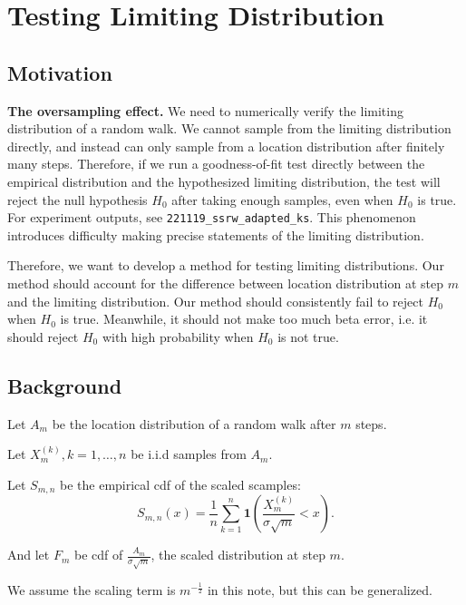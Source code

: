 
\section{Testing Limiting Distribution}

\subsection*{Motivation}

\textbf{The oversampling effect.} We need to numerically verify the limiting distribution of a random walk. We cannot sample from the limiting distribution directly, and instead can only sample from a location distribution after finitely many steps. Therefore, if we run a goodness-of-fit test directly between the empirical distribution and the hypothesized limiting distribution, the test will reject the null hypothesis $H_0$ after taking enough samples, even when $H_0$ is true.
For experiment outputs, see \verb|221119_ssrw_adapted_ks|.
This phenomenon introduces difficulty making precise statements of the limiting distribution. 

Therefore, we want to develop a method for testing limiting distributions. Our method should account for the difference between location distribution at step $m$ and the limiting distribution. Our method should consistently fail to reject $H_0$ when $H_0$ is true. Meanwhile, it should not make too much beta error, i.e. it should reject $H_0$ with high probability when $H_0$ is not true. 

\subsection*{Background}

Let $A_m$ be the location distribution of a random walk after $m$ steps.

Let $X_{m}^{(k)}, k = 1,\ldots, n$ be i.i.d samples from $A_m$. 

Let $S_{m,n}$ be the empirical cdf of the scaled scamples:
\[
S_{m,n}\left(x \right) =
\frac{1}{n} \sum_{k=1}^{n} \mathbf{1}\left( \frac{X_m^{(k)}}{\sigma \sqrt{m} } < x\right) 
.\] 

And let $F_m$ be cdf of $\frac{A_m}{\sigma \sqrt{m} }$, the scaled distribution at step $m$.

We assume the scaling term is $m^{-\frac{1}{2}}$ in this note, but this can be generalized.

